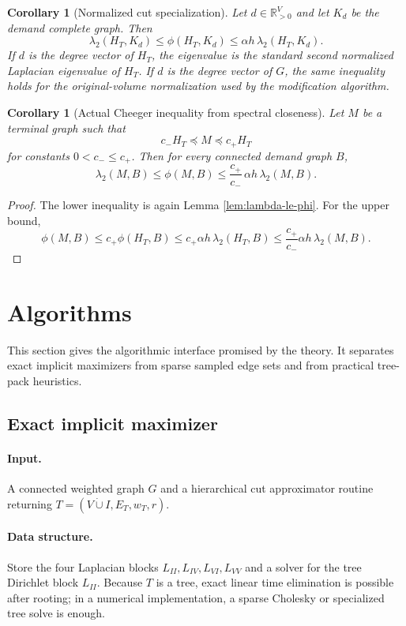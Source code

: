 \documentclass[11pt]{article}
\newtheorem{corollary}[theorem]{Corollary}
\newcommand{\R}{\mathbb{R}}
\begin{document}
\begin{corollary}[Normalized cut specialization]
\label{cor:normalized}
Let $d\in\R_{>0}^V$ and let $K_d$ be the demand complete graph.  Then
\[
  \lambda_2(H_T,K_d)\le \phi(H_T,K_d)
  \le \alpha h\,\lambda_2(H_T,K_d).
\]
If $d$ is the degree vector of $H_T$, the eigenvalue is the standard second
normalized Laplacian eigenvalue of $H_T$.  If $d$ is the degree vector of
$G$, the same inequality holds for the original-volume normalization used by
the modification algorithm.
\end{corollary}

\begin{corollary}[Actual Cheeger inequality from spectral closeness]
\label{cor:actual}
Let $M$ be a terminal graph such that
\[
  c_- H_T\preceq M\preceq c_+ H_T
\]
for constants $0<c_-\le c_+$.  Then for every connected demand graph $B$,
\[
  \lambda_2(M,B)\le \phi(M,B)
  \le \frac{c_+}{c_-}\,\alpha h\,\lambda_2(M,B).
\]
\end{corollary}

\begin{proof}
The lower inequality is again Lemma \ref{lem:lambda-le-phi}.  For the upper
bound,
\[
  \phi(M,B)\le c_+\phi(H_T,B)
  \le c_+\alpha h\,\lambda_2(H_T,B)
  \le \frac{c_+}{c_-}\alpha h\,\lambda_2(M,B).
\]
\end{proof}

\section{Algorithms}

This section gives the algorithmic interface promised by the theory.  It
separates exact implicit maximizers from sparse sampled edge sets and from
practical tree-pack heuristics.

\subsection{Exact implicit maximizer}

\paragraph{Input.}
A connected weighted graph $G$ and a hierarchical cut approximator routine
returning $T=(V\dot\cup I,E_T,w_T,r)$.

\paragraph{Data structure.}
Store the four Laplacian blocks $L_{II},L_{IV},L_{VI},L_{VV}$ and a solver
for the tree Dirichlet block $L_{II}$.  Because $T$ is a tree, exact linear
time elimination is possible after rooting; in a numerical implementation,
a sparse Cholesky or specialized tree solve is enough.
\end{document}
